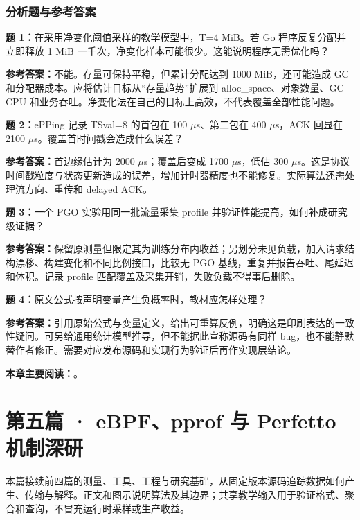 \documentclass[UTF8,fontset=fandol,openany,11pt]{ctexbook}
\begin{document}
\section{分析题与参考答案}
\noindent\textbf{题 1：}在采用净变化阈值采样的教学模型中，T=4 MiB。若 Go 程序反复分配并立即释放 1 MiB 一千次，净变化样本可能很少。这能说明程序无需优化吗？

\noindent\textbf{参考答案：}不能。存量可保持平稳，但累计分配达到 1000 MiB，还可能造成 GC 和分配器成本。应将估计目标从“存量趋势”扩展到 alloc\_space、对象数量、GC CPU 和业务吞吐。净变化法在自己的目标上高效，不代表覆盖全部性能问题。

\noindent\textbf{题 2：}ePPing 记录 TSval=8 的首包在 100 \ensuremath{\mu}s、第二包在 400 \ensuremath{\mu}s，ACK 回显在 2100 \ensuremath{\mu}s。覆盖首时间戳会造成什么误差？

\noindent\textbf{参考答案：}首边缘估计为 2000 \ensuremath{\mu}s；覆盖后变成 1700 \ensuremath{\mu}s，低估 300 \ensuremath{\mu}s。这是协议时间戳粒度与状态更新造成的误差，增加计时器精度也不能修复。实际算法还需处理流方向、重传和 delayed ACK。

\noindent\textbf{题 3：}一个 PGO 实验用同一批流量采集 profile 并验证性能提高，如何补成研究级证据？

\noindent\textbf{参考答案：}保留原测量但限定其为训练分布内收益；另划分未见负载，加入请求结构漂移、构建变化和不同比例接口，比较无 PGO 基线，重复并报告吞吐、尾延迟和体积。记录 profile 匹配覆盖及采集开销，失败负载不得事后删除。

\noindent\textbf{题 4：}原文公式按声明变量产生负概率时，教材应怎样处理？

\noindent\textbf{参考答案：}引用原始公式与变量定义，给出可重算反例，明确这是印刷表达的一致性疑问。可另给通用统计模型推导，但不能据此宣称源码有同样 bug，也不能静默替作者修正。需要对应发布源码和实现行为验证后再作实现层结论。

\medskip\noindent\textbf{本章主要阅读：}\cite{paper-scalene}\cite{paper-hardware}\cite{paper-epping}\cite{front-go121}\cite{front-trace2024}\cite{front-flight2025}\cite{front-flight-source}\cite{front-otel2024}\cite{front-otel-spec}。

\begingroup
\setmainfont{DejaVu Serif}
\setsansfont{DejaVu Sans}
\setmonofont[Scale=.85]{DejaVu Sans Mono}
\part*{第五篇 · eBPF、pprof 与 Perfetto 机制深研}
本篇接续前四篇的测量、工具、工程与研究基础，从固定版本源码追踪数据如何产生、传输与解释。正文和图示说明算法及其边界；共享教学输入用于验证格式、聚合和查询，不冒充运行时采样或生产收益。
\end{document}
